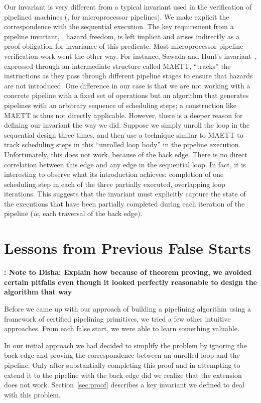 Our invariant is very different from a typical invariant
used in the verification of pipelined machines (\eg, for
microprocessor pipelines).  We make explicit the
correspondence with the sequential execution.  The key
requirement from a pipeline invariant, \viz, hazard freedom,
is left implicit and arises indirectly as a proof obligation
for invariance of this predicate.  Most microprocessor
pipeline verification work went the other way.  For
instance, Sawada and Hunt's invariant~\cite{sh:pipeline},
expressed through an intermediate structure called MAETT,
``tracks'' the instructions as they pass through different
pipeline stages to ensure that hazards are not introduced.
One difference in our case is that we are not working with a
concrete pipeline with a fixed set of operations but an
algorithm that generates pipelines with an arbitrary
sequence of scheduling steps; a construction like MAETT is
thus not directly applicable.  However, there is a deeper
reason for defining our invariant the way we did.
Suppose we simply unroll the loop in the sequential
design three times, and then use a technique similar to
MAETT to track scheduling steps in this ``unrolled loop
body'' in the pipeline execution.  Unfortunately, this does
not work, because of the back edge.  There is no direct
correlation between this edge and any edge in the sequential
loop.  In fact, it is interesting to observe what its
introduction achieves: completion of one scheduling step in
each of the three partially executed, overlapping loop
iterations.  This suggests that the invariant must
explicitly capture the state of the executions that have
been partially completed during each iteration of the
pipeline ({\em ie}, each traversal of the back edge).



\section{Lessons from Previous False Starts}

{\bf: Note to Disha: Explain how because of theorem proving, we avoided certain pitfalls even though
it looked perfectly reasonable to design the algorithm that way}

Before we came up with our approach of building a pipelining
algorithm using a framework of certified pipelining primitives,
we tried a few other intuitive approaches.
From each false start, we were able to learn something valuable.

In our initial approach we had decided to simplify the problem
by ignoring the back edge and proving the correspondence
between an unrolled loop and the pipeline.
Only after substantially completing this proof and in
attempting to extend it to the pipeline with the back edge
did we realize that the extension does not work. Section~\ref{sec:proof} describes a key
invariant we defined to deal with this problem.

